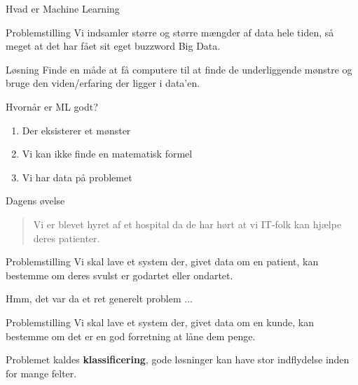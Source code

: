 \documentclass[12pt,t]{beamer}
\begin{document}
     \begin{frame}[t]{Hvad er Machine Learning}
         \begin{block}{Problemstilling}
             Vi indsamler større og større mængder af data hele tiden, så meget
             at det har fået sit eget buzzword \alert{Big Data}. \\
         \end{block}
         \pause
         \begin{block}{Løsning}
            Finde en måde at få computere til at finde de underliggende mønstre
            og bruge den viden/erfaring der ligger i data'en.
         \end{block}
         \pause
         \begin{block}{Hvornår er ML godt?}
             \begin{enumerate}
                 \item Der eksisterer et mønster \pause
                 \item Vi kan ikke finde en matematisk formel \pause
                 \item Vi har data på problemet
             \end{enumerate}
         \end{block}
     \end{frame}

    \begin{frame}[t]{Dagens øvelse}
        \begin{quote}
            Vi er blevet hyret af et hospital da de har hørt at vi IT-folk
            kan hjælpe deres patienter.
        \end{quote}
        \pause
        \begin{block}{Problemstilling}
            Vi skal lave et system der, givet data om en patient, kan bestemme
            om deres svulst er godartet eller ondartet.
        \end{block}
        \pause
        \centering Hmm, det var da et ret generelt problem $\dots$
        \pause
        \begin{block}{Problemstilling}
            Vi skal lave et system der, givet data om en \alert{kunde},
            kan bestemme om det er en god forretning at låne dem penge.
        \end{block}
        \pause
        \centering Problemet kaldes \textbf{klassificering}, gode løsninger kan
        have stor indflydelse inden for mange felter.
    \end{frame}
\end{document}
